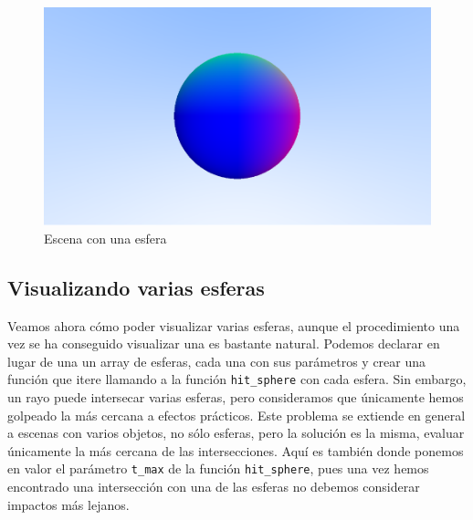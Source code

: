 \begin{figure} [ht]
    \centering
    \includegraphics[scale = 0.3]{img/C7/esfera_renderizada.png}
    \caption{Escena con una esfera}
    \label{fig:una-esfera}
\end{figure}

\subsection{Visualizando varias esferas}

Veamos ahora cómo poder visualizar varias esferas, aunque el procedimiento una vez se ha conseguido visualizar una es bastante natural. Podemos declarar en lugar de una un array de esferas, cada una con sus parámetros y crear una función que itere llamando a la función \verb|hit_sphere| con cada esfera. Sin embargo, un rayo puede intersecar varias esferas, pero consideramos que únicamente hemos golpeado la más cercana a efectos prácticos. Este problema se extiende en general a escenas con varios objetos, no sólo esferas, pero la solución es la misma, evaluar únicamente la más cercana de las intersecciones. Aquí es también donde ponemos en valor el parámetro \verb|t_max| de la función \verb|hit_sphere|, pues una vez hemos encontrado una intersección con una de las esferas no debemos considerar impactos más lejanos.

